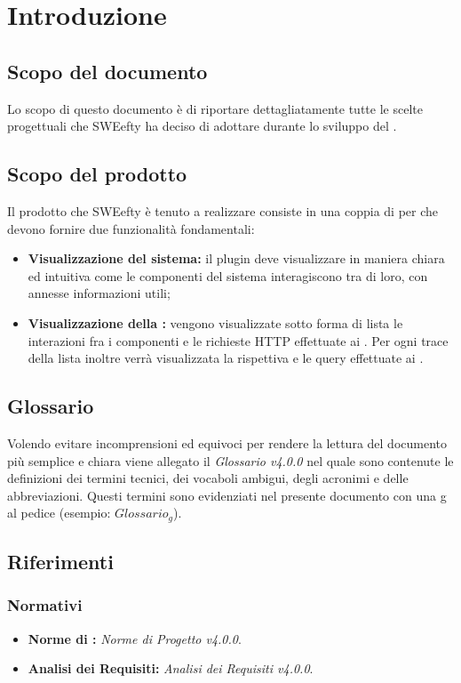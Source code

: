 \section{Introduzione}
\label{sec:intro}
\subsection{Scopo del documento}
Lo scopo di questo documento è di riportare dettagliatamente tutte le scelte progettuali che SWEefty ha deciso di adottare durante lo sviluppo del .

\subsection{Scopo del prodotto}
Il prodotto che SWEefty è tenuto a realizzare consiste in una coppia di  per  che devono fornire due funzionalità fondamentali:
\begin{itemize}
	\item \textbf{Visualizzazione  del sistema:} il plugin deve visualizzare in maniera chiara ed intuitiva come le componenti del sistema interagiscono tra di loro, con annesse informazioni utili;
	\item \textbf{Visualizzazione della :} vengono visualizzate sotto forma di lista le interazioni fra i componenti e le richieste HTTP effettuate ai . Per ogni trace della lista inoltre verrà visualizzata la rispettiva  e le query effettuate ai .
\end{itemize}

\subsection{Glossario}
Volendo evitare incomprensioni  ed equivoci per rendere la lettura del documento più semplice e chiara viene allegato il \emph{Glossario v4.0.0} nel quale sono contenute le definizioni dei termini tecnici, dei vocaboli ambigui, degli acronimi e delle abbreviazioni. Questi termini sono evidenziati nel presente documento con una g al pedice (esempio: $Glossario_{g}$).
\subsection{Riferimenti}
\subsubsection{Normativi}
\begin{itemize}
	\item \textbf{Norme di :} \emph{Norme di Progetto v4.0.0}.
	\item \textbf{Analisi dei Requisiti:} \emph{Analisi dei Requisiti v4.0.0}.
\end{itemize}

